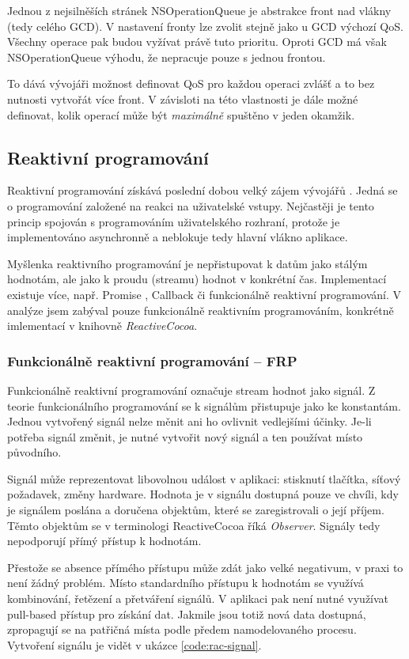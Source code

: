 Jednou z nejsilněších stránek NSOperationQueue je abstrakce front nad vlákny (tedy celého GCD).
V nastavení fronty lze zvolit stejně jako u GCD výchozí QoS.
Všechny operace pak budou vyžívat právě tuto prioritu.
Oproti GCD má však NSOperationQueue výhodu, že nepracuje pouze s jednou frontou.

To dává vývojáři možnost definovat QoS pro každou operaci zvlášť a to bez nutnosti vytvořát více front.
V závisloti na této vlastnosti je dále možné definovat, kolik operací může být \textit{maximálně} spuštěno v jeden okamžik.

\subsection{Reaktivní programování}\label{vlakna-rac}

Reaktivní programování získává poslední dobou velký zájem vývojářů \cite{oneagency-rx}.
Jedná se o programování založené na reakci na uživatelské vstupy.
Nejčastěji je tento princip spojován s programováním uživatelského rozhraní, protože je implementováno asynchronně a neblokuje tedy hlavní vlákno aplikace.

Myšlenka reaktivního programování je nepřistupovat k datům jako stálým hodnotám, ale jako k proudu (streamu) hodnot v konkrétní čas.
Implementací existuje více, např. Promise \cite{slaks-promise}, Callback \cite{yld-callback} či funkcionálně reaktivní programování.
V analýze jsem zabýval pouze funkcionálně reaktivním programováním, konkrétně imlementací v knihovně \textit{ReactiveCocoa}.

\subsubsection*{Funkcionálně reaktivní programování -- FRP}

Funkcionálně reaktivní programování označuje stream hodnot jako signál.
Z teorie funkcionálního programování se k signálům přistupuje jako ke konstantám.
Jednou vytvořený signál nelze měnit ani ho ovlivnit vedlejšími účinky.
Je-li potřeba signál změnit, je nutné vytvořit nový signál a ten používat místo původního.

Signál může reprezentovat libovolnou událost v aplikaci: stisknutí tlačítka, síťový požadavek, změny hardware.
Hodnota je v signálu dostupná pouze ve chvíli, kdy je signálem poslána a doručena objektům, které se zaregistrovali o její příjem.
Těmto objektům se v terminologi ReactiveCocoa říká \textit{Observer}.
Signály tedy nepodporují přímý přístup k hodnotám.

Přestože se absence přímého přístupu může zdát jako velké negativum, v praxi to není žádný problém.
Místo standardního přístupu k hodnotám se využívá kombinování, řetězení a přetváření signálů.
V aplikaci pak není nutné využívat pull-based přístup pro získání dat.
Jakmile jsou totiž nová data dostupná, zpropagují se na patřičná místa podle předem namodelovaného procesu.
Vytvoření signálu je vidět v ukázce \ref{code:rac-signal}.


